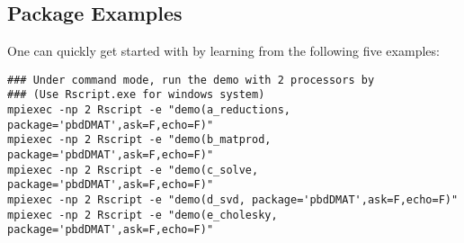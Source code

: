 \subsection[]{Package Examples}
\label{sec:more_examples}

One can quickly get started with  by learning from the following five examples:
\begin{lstlisting}[title=Shell Script]
### Under command mode, run the demo with 2 processors by
### (Use Rscript.exe for windows system)
mpiexec -np 2 Rscript -e "demo(a_reductions, package='pbdDMAT',ask=F,echo=F)"
mpiexec -np 2 Rscript -e "demo(b_matprod, package='pbdDMAT',ask=F,echo=F)"
mpiexec -np 2 Rscript -e "demo(c_solve, package='pbdDMAT',ask=F,echo=F)"
mpiexec -np 2 Rscript -e "demo(d_svd, package='pbdDMAT',ask=F,echo=F)"
mpiexec -np 2 Rscript -e "demo(e_cholesky, package='pbdDMAT',ask=F,echo=F)"
\end{lstlisting}
% 
